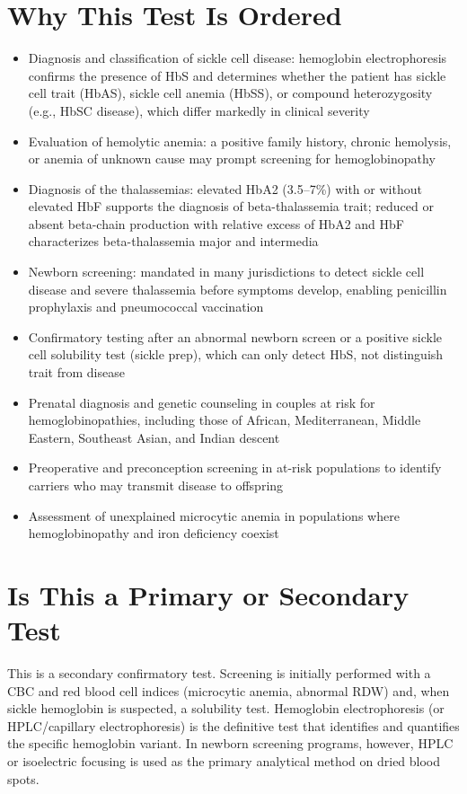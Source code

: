 \section*{Why This Test Is Ordered}
\begin{itemize}
  \item Diagnosis and classification of sickle cell disease: hemoglobin electrophoresis confirms the presence of HbS and determines whether the patient has sickle cell trait (HbAS), sickle cell anemia (HbSS), or compound heterozygosity (e.g., HbSC disease), which differ markedly in clinical severity
  \item Evaluation of hemolytic anemia: a positive family history, chronic hemolysis, or anemia of unknown cause may prompt screening for hemoglobinopathy
  \item Diagnosis of the thalassemias: elevated HbA2 (3.5--7\%) with or without elevated HbF supports the diagnosis of beta-thalassemia trait; reduced or absent beta-chain production with relative excess of HbA2 and HbF characterizes beta-thalassemia major and intermedia
  \item Newborn screening: mandated in many jurisdictions to detect sickle cell disease and severe thalassemia before symptoms develop, enabling penicillin prophylaxis and pneumococcal vaccination
  \item Confirmatory testing after an abnormal newborn screen or a positive sickle cell solubility test (sickle prep), which can only detect HbS, not distinguish trait from disease
  \item Prenatal diagnosis and genetic counseling in couples at risk for hemoglobinopathies, including those of African, Mediterranean, Middle Eastern, Southeast Asian, and Indian descent
  \item Preoperative and preconception screening in at-risk populations to identify carriers who may transmit disease to offspring
  \item Assessment of unexplained microcytic anemia in populations where hemoglobinopathy and iron deficiency coexist
\end{itemize}

\section*{Is This a Primary or Secondary Test}
This is a secondary confirmatory test. Screening is initially performed with a CBC and red blood cell indices (microcytic anemia, abnormal RDW) and, when sickle hemoglobin is suspected, a solubility test. Hemoglobin electrophoresis (or HPLC/capillary electrophoresis) is the definitive test that identifies and quantifies the specific hemoglobin variant. In newborn screening programs, however, HPLC or isoelectric focusing is used as the primary analytical method on dried blood spots.

